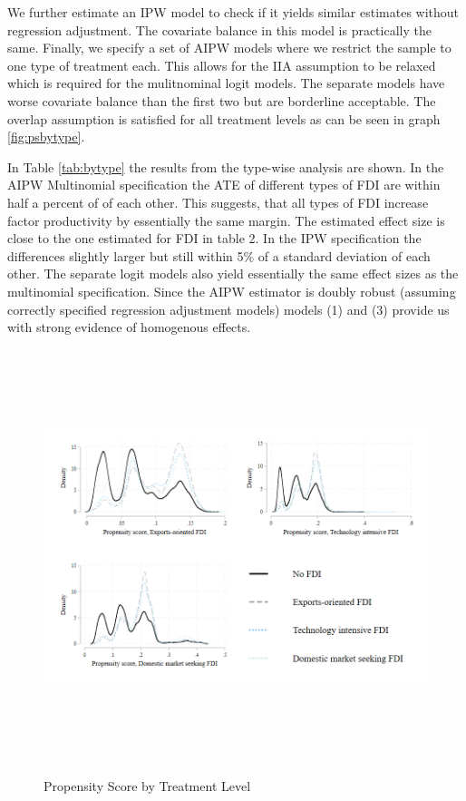 \documentclass[a4paper,11pt]{scrartcl}
\begin{document}
We further estimate an IPW model to check if it yields similar estimates without regression adjustment. The covariate balance in this model is practically the same. Finally, we specify a set of AIPW models where we restrict the sample to one type of treatment each. This allows for the IIA assumption to be relaxed which is required for the mulitnominal logit models. The separate models have worse covariate balance than the first two but are borderline acceptable. The overlap assumption is satisfied for all treatment levels as can be seen in graph \ref{fig:psbytype}. 


In Table \ref{tab:bytype} the results from the type-wise analysis are shown. In the AIPW Multinomial specification the ATE of different types of FDI are within half a percent of of each other. This suggests, that all types of FDI increase factor productivity by essentially the same margin. The estimated effect size is close to the one estimated for FDI in table 2. In the IPW specification the differences slightly larger but still within 5\% of a standard deviation of each other.  The separate logit models also yield essentially the same effect sizes as the multinomial specification. Since the AIPW estimator is doubly robust (assuming correctly specified regression adjustment models) models (1) and (3) provide us with strong evidence of homogenous effects.


\begin{figure}[h]
	
	\caption{Propensity Score by Treatment Level}
\hspace*{-2cm}  	
	\includegraphics[height=12cm]{overlap_type.png}\\ 
	\label{fig:over_typ}
 
\end{figure}
\end{document}
